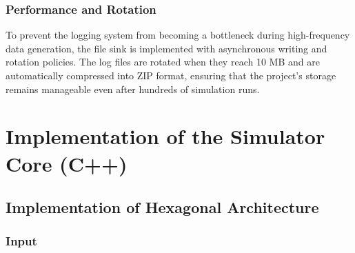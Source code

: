 \subsubsection{Performance and Rotation}

To prevent the logging system from becoming a bottleneck during high-frequency data generation, the file sink is 
implemented with asynchronous writing and rotation policies. The log files are rotated when they reach 10 MB and are 
automatically compressed into ZIP format, ensuring that the project's storage remains manageable even after hundreds 
of simulation runs.









\section{Implementation of the Simulator Core (C++)}


\subsection{Implementation of Hexagonal Architecture}








\subsubsection{Input}


